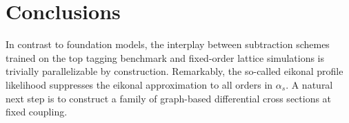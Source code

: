 \section{Conclusions}\label{sec:conclusions}

In contrast to foundation models, the interplay between subtraction
schemes trained on the top tagging benchmark and fixed-order lattice
simulations is trivially parallelizable by construction. Remarkably, the
so-called eikonal profile likelihood suppresses the eikonal
approximation to all orders in $\alpha_s$. A natural next step is to
construct a family of graph-based differential cross sections at fixed
coupling.

